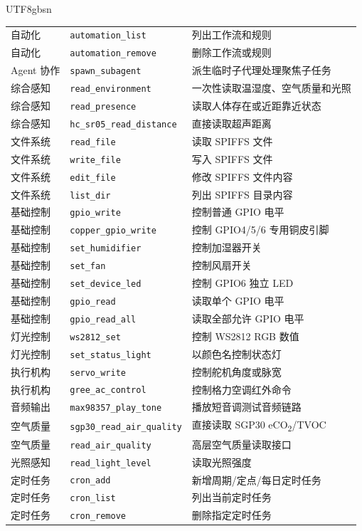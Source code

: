\documentclass[a4paper,12pt]{article}
\begin{document}
\begin{CJK*}{UTF8}{gbsn}
\begin{longtable}{p{2.8cm}p{3.6cm}p{8.0cm}}
自动化 & \texttt{automation\_list} & 列出工作流和规则 \\
自动化 & \texttt{automation\_remove} & 删除工作流或规则 \\
Agent 协作 & \texttt{spawn\_subagent} & 派生临时子代理处理聚焦子任务 \\
综合感知 & \texttt{read\_environment} & 一次性读取温湿度、空气质量和光照 \\
综合感知 & \texttt{read\_presence} & 读取人体存在或近距靠近状态 \\
综合感知 & \texttt{hc\_sr05\_read\_distance} & 直接读取超声距离 \\
文件系统 & \texttt{read\_file} & 读取 SPIFFS 文件 \\
文件系统 & \texttt{write\_file} & 写入 SPIFFS 文件 \\
文件系统 & \texttt{edit\_file} & 修改 SPIFFS 文件内容 \\
文件系统 & \texttt{list\_dir} & 列出 SPIFFS 目录内容 \\
基础控制 & \texttt{gpio\_write} & 控制普通 GPIO 电平 \\
基础控制 & \texttt{copper\_gpio\_write} & 控制 GPIO4/5/6 专用铜皮引脚 \\
基础控制 & \texttt{set\_humidifier} & 控制加湿器开关 \\
基础控制 & \texttt{set\_fan} & 控制风扇开关 \\
基础控制 & \texttt{set\_device\_led} & 控制 GPIO6 独立 LED \\
基础控制 & \texttt{gpio\_read} & 读取单个 GPIO 电平 \\
基础控制 & \texttt{gpio\_read\_all} & 读取全部允许 GPIO 电平 \\
灯光控制 & \texttt{ws2812\_set} & 控制 WS2812 RGB 数值 \\
灯光控制 & \texttt{set\_status\_light} & 以颜色名控制状态灯 \\
执行机构 & \texttt{servo\_write} & 控制舵机角度或脉宽 \\
执行机构 & \texttt{gree\_ac\_control} & 控制格力空调红外命令 \\
音频输出 & \texttt{max98357\_play\_tone} & 播放短音调测试音频链路 \\
空气质量 & \texttt{sgp30\_read\_air\_quality} & 直接读取 SGP30 eCO\textsubscript{2}/TVOC \\
空气质量 & \texttt{read\_air\_quality} & 高层空气质量读取接口 \\
光照感知 & \texttt{read\_light\_level} & 读取光照强度 \\
定时任务 & \texttt{cron\_add} & 新增周期/定点/每日定时任务 \\
定时任务 & \texttt{cron\_list} & 列出当前定时任务 \\
定时任务 & \texttt{cron\_remove} & 删除指定定时任务 \\
\bottomrule
\end{longtable}


\end{CJK*}
\end{document}

